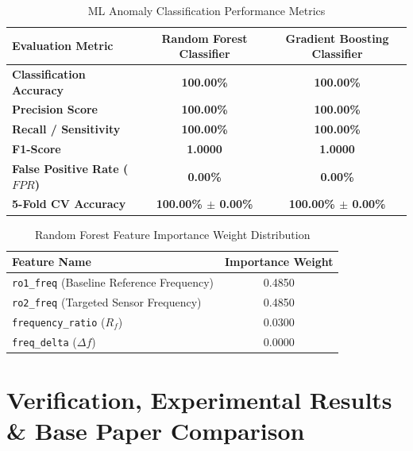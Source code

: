 \documentclass[11pt,a4paper,oneside]{book}
\begin{document}
\begin{table}[h!]
\centering
\begin{tabularx}{\textwidth}{X c c}
\toprule
\textbf{Evaluation Metric} & \textbf{Random Forest Classifier} & \textbf{Gradient Boosting Classifier} \\
\midrule
\textbf{Classification Accuracy} & \textbf{100.00\%} & \textbf{100.00\%} \\
\textbf{Precision Score} & \textbf{100.00\%} & \textbf{100.00\%} \\
\textbf{Recall / Sensitivity} & \textbf{100.00\%} & \textbf{100.00\%} \\
\textbf{F1-Score} & \textbf{1.0000} & \textbf{1.0000} \\
\textbf{False Positive Rate ($FPR$)} & \textbf{0.00\%} & \textbf{0.00\%} \\
\textbf{5-Fold CV Accuracy} & \textbf{100.00\% $\pm$ 0.00\%} & \textbf{100.00\% $\pm$ 0.00\%} \\
\bottomrule
\end{tabularx}
\caption{ML Anomaly Classification Performance Metrics}
\label{tab:ml_metrics}
\end{table}

\begin{table}[h!]
\centering
\begin{tabularx}{0.7\textwidth}{X c}
\toprule
\textbf{Feature Name} & \textbf{Importance Weight} \\
\midrule
\texttt{ro1\_freq} (Baseline Reference Frequency) & 0.4850 \\
\texttt{ro2\_freq} (Targeted Sensor Frequency) & 0.4850 \\
\texttt{frequency\_ratio} ($R_f$) & 0.0300 \\
\texttt{freq\_delta} ($\Delta f$) & 0.0000 \\
\bottomrule
\end{tabularx}
\caption{Random Forest Feature Importance Weight Distribution}
\label{tab:feature_importance}
\end{table}

\chapter{Verification, Experimental Results \& Base Paper Comparison}
\end{document}
